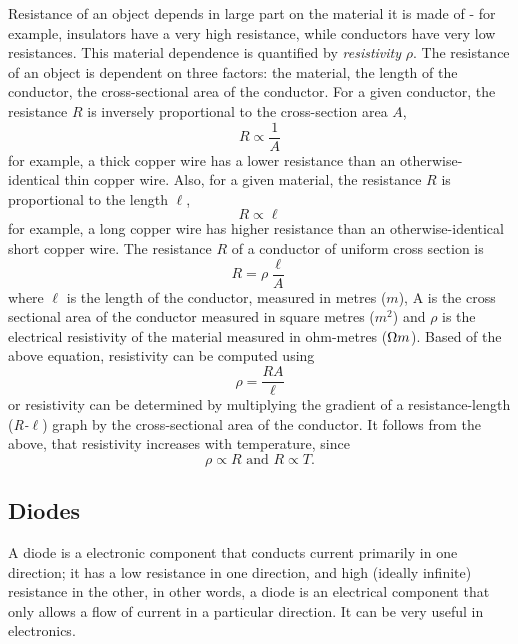 Resistance of an object depends in large part on the material it is made of - for example, insulators have a very high resistance, while conductors have very low resistances. This material dependence is quantified by \textit{resistivity} $\rho$. The resistance of an object is dependent on three factors: the material, the length of the conductor, the cross-sectional area of the conductor. For a given conductor, the resistance $R$ is inversely proportional to the cross-section area $A$,
\begin{equation}
    R \propto \frac{1}{A}
\end{equation}
for example, a thick copper wire has a lower resistance than an otherwise-identical thin copper wire. Also, for a given material, the resistance $R$ is proportional to the length $\ell$,
\begin{equation}
    R \propto \ell
\end{equation}
for example, a long copper wire has higher resistance than an otherwise-identical short copper wire. The resistance $R$ of a conductor of uniform cross section is
\begin{equation}
    R = \rho \frac{\ell}{A}
\end{equation}
where $\ell$ is the length of the conductor, measured in metres ($m$), A is the cross sectional area of the conductor measured in square metres ($m^2$) and $\rho$ is the electrical resistivity of the material measured in ohm-metres ($\ohm m$). Based of the above equation, resistivity can be computed using 
\begin{equation}
    \rho = \frac{RA}{\ell}
\end{equation}
or resistivity can be determined by multiplying the gradient of a resistance-length (\textit{R-$\ell$}) graph by the cross-sectional area of the conductor. It follows from the above, that resistivity increases with temperature, since 
\begin{equation}
    \rho \propto R \text{ and } R \propto T.
\end{equation}

\subsection{Diodes}

A diode is a electronic component that conducts current primarily in one direction; it has a low resistance in one direction, and high (ideally infinite) resistance in the other, in other words, a diode is an electrical component that only allows a flow of current in a particular direction. It can be very useful in electronics. 

